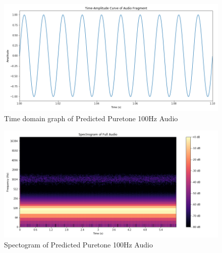 \documentclass{ioereport}
\begin{document}
    \begin{figure}[H]
        \centering
        \includegraphics[width=\linewidth]{assets/audio_results/predpuretone100hztime.png}
        \caption{Time domain graph of Predicted Puretone 100Hz Audio}
        \label{fig:pred-pure100-time}
    \end{figure}
    \begin{figure}[H]
        \centering
        \includegraphics[width=\linewidth]{assets/audio_results/predpuretone100hzspec.png}
        \caption{Spectogram of Predicted Puretone 100Hz Audio}
        \label{fig:pred-pure100-spec}
    \end{figure}
\end{document}
